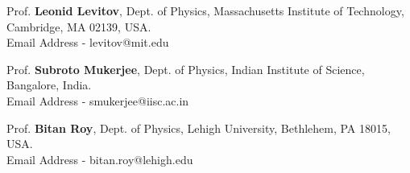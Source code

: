 

\begin{cventries}


\begin{cvitems}

  \item{Prof. \textbf{Leonid Levitov},} %
	{Dept. of Physics, Massachusetts Institute of Technology, Cambridge, MA 02139, USA.} %
	{} %
	{\\}
	{Email Address - levitov@mit.edu} %
  \item{Prof. \textbf{Subroto Mukerjee},} %
	{Dept. of Physics, Indian Institute of Science, Bangalore, India.} %
	{} %
	{\\}
	{Email Address - smukerjee@iisc.ac.in} %
  \item{Prof. \textbf{Bitan Roy},} %
	{Dept. of Physics, Lehigh University, Bethlehem, PA 18015, USA.} %
	{} %
	{\\}
	{Email Address - bitan.roy@lehigh.edu} %


\end{cvitems}
\end{cventries}

